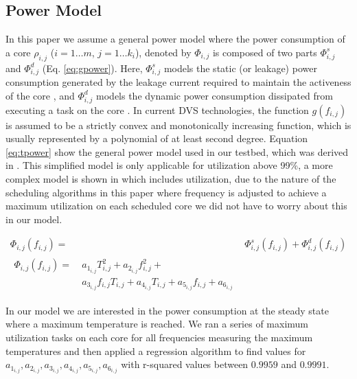 \documentclass[conference]{IEEEtran}
\begin{document}
\subsection{Power Model}
\label{power-model}
In this paper we assume a general power model where the power consumption of a core $\rho_{i,j}$  ($i=1\ldots m$, $j=1\ldots k_i$), denoted by $\Phi_{i,j}$ is composed of two
parts $\Phi^{s}_{i,j}$ and $\Phi^{d}_{i,j}$ (Eq. \ref{eq:gpower}). Here, $\Phi^{s}_{i,j}$ models the static
(or leakage) power consumption
generated by the leakage current required to maintain the activeness of the core \cite{Chen09,Langen06}, and
$\Phi^{d}_{i,j}$ models the dynamic power
consumption dissipated from executing a task on the core \cite{Aydin03}.
In current DVS technologies, the function $g(f_{i,j})$ is assumed to be a strictly convex and monotonically increasing function,
which is usually represented by a polynomial of at least second degree.
Equation \ref{eq:tpower} show the general power model used in our testbed, which was derived in \cite{Li12}. This simplified model is only applicable for utilization above 99\%, a more complex model is shown in \cite{Li12} which includes utilization, due to the nature of the scheduling algorithms in this paper where frequency is adjusted to achieve a maximum utilization on each scheduled core we did not have to worry about this in our model.

\begin{subequations}\label{eq:power}
	\begin{align}
		\Phi_{i,j}(f_{i,j}) =\ &\Phi^{s}_{i,j}(f_{i,j}) + \Phi^{d}_{i,j}(f_{i,j}) \label{eq:gpower} \\
		\begin{split}
			\Phi_{i,j}(f_{i,j}) =\ &a_{1_{i,j}}T^{2}_{i,j} + a_{2_{i,j}}f^{2}_{i,j} + \\
			&a_{3_{i,j}}f_{i,j}T_{i,j} + a_{4_{i,j}}T_{i,j} + a_{5_{i,j}}f_{i,j} + a_{6_{i,j}} \label{eq:tpower}
		\end{split}
	\end{align}
\end{subequations}

In our model we are interested in the power consumption at the steady state where a maximum temperature is reached. We ran a series of maximum utilization tasks on each core for all frequencies measuring the maximum temperatures and then applied a regression algorithm to find values for $a_{1_{i,j}}, a_{2_{i,j}}, a_{3_{i,j}}, a_{4_{i,j}}, a_{5_{i,j}}, a_{6_{i,j}}$ with r-squared values between $0.9959$ and $0.9991$.
\end{document}
